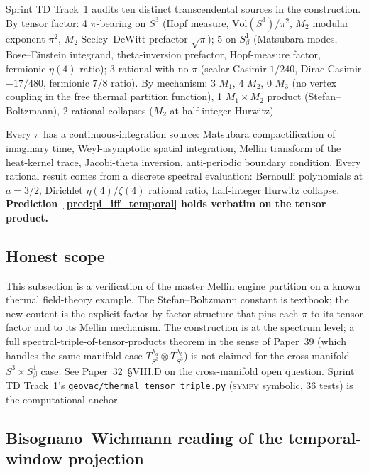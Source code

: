 \documentclass[11pt]{article}
\begin{document}
Sprint TD Track~1 audits ten distinct transcendental sources in the
construction.  By tensor factor: 4 $\pi$-bearing on $S^3$ (Hopf
measure, $\mathrm{Vol}(S^3)/\pi^2$, $M_2$ modular exponent $\pi^2$,
$M_2$ Seeley--DeWitt prefactor $\sqrt{\pi}$); 5 on $S^1_\beta$
(Matsubara modes, Bose--Einstein integrand, theta-inversion prefactor,
Hopf-measure factor, fermionic $\eta(4)$ ratio); 3 rational with no
$\pi$ (scalar Casimir $1/240$, Dirac Casimir $-17/480$, fermionic
$7/8$ ratio).  By mechanism: 3 $M_1$, 4 $M_2$, 0 $M_3$ (no vertex
coupling in the free thermal partition function), 1 $M_1\times M_2$
product (Stefan--Boltzmann), 2 rational collapses ($M_2$ at
half-integer Hurwitz).

Every $\pi$ has a continuous-integration source: Matsubara
compactification of imaginary time, Weyl-asymptotic spatial
integration, Mellin transform of the heat-kernel trace, Jacobi-theta
inversion, anti-periodic boundary condition.  Every rational result
comes from a discrete spectral evaluation: Bernoulli polynomials at
$a=3/2$, Dirichlet $\eta(4)/\zeta(4)$ rational ratio, half-integer
Hurwitz collapse.  \textbf{Prediction~\ref{pred:pi_iff_temporal} holds
verbatim on the tensor product.}

\subsection{Honest scope}
\label{subsec:tensor_scope}

This subsection is a verification of the master Mellin engine
partition on a known thermal field-theory example.  The
Stefan--Boltzmann constant is textbook; the new content is the
explicit factor-by-factor structure that pins each $\pi$ to its
tensor factor and to its Mellin mechanism.  The construction is at
the spectrum level; a full spectral-triple-of-tensor-products theorem
in the sense of Paper~39 (which handles the same-manifold case
$T_{S^3}^{\lambda_a}\otimes T_{S^3}^{\lambda_b}$) is not claimed for
the cross-manifold $S^3 \times S^1_\beta$ case.  See Paper~32~§VIII.D
on the cross-manifold open question.  Sprint TD Track~1's
\verb|geovac/thermal_tensor_triple.py| (\textsc{sympy} symbolic, 36
tests) is the computational anchor.

\subsection{Bisognano--Wichmann reading of the temporal-window projection}
\label{subsec:bisognano_wichmann_reading}
\end{document}
